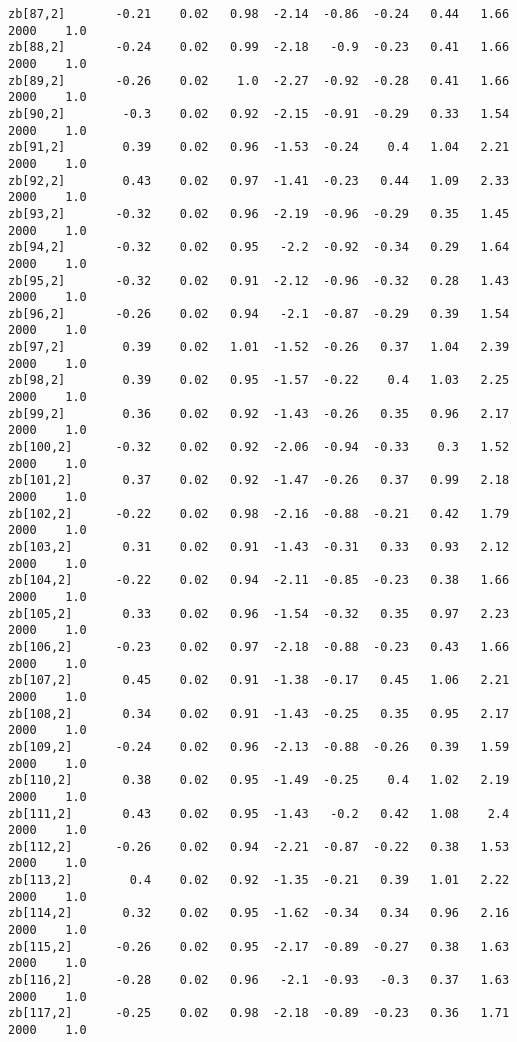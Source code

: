 \documentclass[11pt]{article}
\begin{document}
\begin{Verbatim}[commandchars=\\\{\}]
zb[87,2]       -0.21    0.02   0.98  -2.14  -0.86  -0.24   0.44   1.66   2000    1.0
zb[88,2]       -0.24    0.02   0.99  -2.18   -0.9  -0.23   0.41   1.66   2000    1.0
zb[89,2]       -0.26    0.02    1.0  -2.27  -0.92  -0.28   0.41   1.66   2000    1.0
zb[90,2]        -0.3    0.02   0.92  -2.15  -0.91  -0.29   0.33   1.54   2000    1.0
zb[91,2]        0.39    0.02   0.96  -1.53  -0.24    0.4   1.04   2.21   2000    1.0
zb[92,2]        0.43    0.02   0.97  -1.41  -0.23   0.44   1.09   2.33   2000    1.0
zb[93,2]       -0.32    0.02   0.96  -2.19  -0.96  -0.29   0.35   1.45   2000    1.0
zb[94,2]       -0.32    0.02   0.95   -2.2  -0.92  -0.34   0.29   1.64   2000    1.0
zb[95,2]       -0.32    0.02   0.91  -2.12  -0.96  -0.32   0.28   1.43   2000    1.0
zb[96,2]       -0.26    0.02   0.94   -2.1  -0.87  -0.29   0.39   1.54   2000    1.0
zb[97,2]        0.39    0.02   1.01  -1.52  -0.26   0.37   1.04   2.39   2000    1.0
zb[98,2]        0.39    0.02   0.95  -1.57  -0.22    0.4   1.03   2.25   2000    1.0
zb[99,2]        0.36    0.02   0.92  -1.43  -0.26   0.35   0.96   2.17   2000    1.0
zb[100,2]      -0.32    0.02   0.92  -2.06  -0.94  -0.33    0.3   1.52   2000    1.0
zb[101,2]       0.37    0.02   0.92  -1.47  -0.26   0.37   0.99   2.18   2000    1.0
zb[102,2]      -0.22    0.02   0.98  -2.16  -0.88  -0.21   0.42   1.79   2000    1.0
zb[103,2]       0.31    0.02   0.91  -1.43  -0.31   0.33   0.93   2.12   2000    1.0
zb[104,2]      -0.22    0.02   0.94  -2.11  -0.85  -0.23   0.38   1.66   2000    1.0
zb[105,2]       0.33    0.02   0.96  -1.54  -0.32   0.35   0.97   2.23   2000    1.0
zb[106,2]      -0.23    0.02   0.97  -2.18  -0.88  -0.23   0.43   1.66   2000    1.0
zb[107,2]       0.45    0.02   0.91  -1.38  -0.17   0.45   1.06   2.21   2000    1.0
zb[108,2]       0.34    0.02   0.91  -1.43  -0.25   0.35   0.95   2.17   2000    1.0
zb[109,2]      -0.24    0.02   0.96  -2.13  -0.88  -0.26   0.39   1.59   2000    1.0
zb[110,2]       0.38    0.02   0.95  -1.49  -0.25    0.4   1.02   2.19   2000    1.0
zb[111,2]       0.43    0.02   0.95  -1.43   -0.2   0.42   1.08    2.4   2000    1.0
zb[112,2]      -0.26    0.02   0.94  -2.21  -0.87  -0.22   0.38   1.53   2000    1.0
zb[113,2]        0.4    0.02   0.92  -1.35  -0.21   0.39   1.01   2.22   2000    1.0
zb[114,2]       0.32    0.02   0.95  -1.62  -0.34   0.34   0.96   2.16   2000    1.0
zb[115,2]      -0.26    0.02   0.95  -2.17  -0.89  -0.27   0.38   1.63   2000    1.0
zb[116,2]      -0.28    0.02   0.96   -2.1  -0.93   -0.3   0.37   1.63   2000    1.0
zb[117,2]      -0.25    0.02   0.98  -2.18  -0.89  -0.23   0.36   1.71   2000    1.0

\end{Verbatim}
\end{document}

